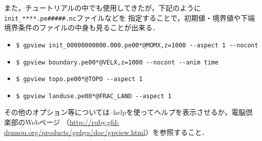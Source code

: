 また，チュートリアルの中でも使用してきたが，下記のように\verb|init_****.pe#####.nc|ファイルなどを
指定することで，初期値・境界値や下端境界条件のファイルの中身も見ることが出来る．

\begin{itemize}
 \item \verb|$ gpview init_00000000000.000.pe00*@MOMX,z=1000 --aspect 1 --nocont|
 \item \verb|$ gpview boundary.pe00*@VELX,z=1000 --nocont --anim time|
 \item \verb|$ gpview topo.pe00*@TOPO --aspect 1|
 \item \verb|$ gpview landuse.pe00*@FRAC_LAND --aspect 1|
\end{itemize}


その他のオプション等については--helpを使ってヘルプを表示させるか，電脳倶楽部のWebページ
（\url{http://ruby.gfd-dennou.org/products/gphys/doc/gpview.html}）を参照すること．

